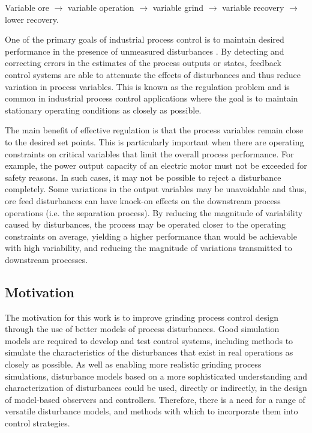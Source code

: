 Variable ore $\to$ variable operation $\to$ variable grind $\to$ variable recovery $\to$ lower recovery. 

One of the primary goals of industrial process control is to maintain desired performance in the presence of unmeasured disturbances \citep{astrom_computer_1997}. By detecting and correcting errors in the estimates of the process outputs or states, feedback control systems are able to attenuate the effects of disturbances and thus reduce variation in process variables. This is known as the regulation problem and is common in industrial process control applications where the goal is to maintain stationary operating conditions as closely as possible.

The main benefit of effective regulation is that the process variables remain close to the desired set points. This is particularly important when there are operating constraints on critical variables that limit the overall process performance. For example, the power output capacity of an electric motor must not be exceeded for safety reasons. In such cases, it may not be possible to reject a disturbance completely. Some variations in the output variables may be unavoidable and thus, ore feed disturbances can have knock-on effects on the downstream process operations (i.e. the separation process). By reducing the magnitude of variability caused by disturbances, the process may be operated closer to the operating constraints on average, yielding a higher performance than would be achievable with high variability, and reducing the magnitude of variations transmitted to downstream processes.

\subsection*{Motivation}

The motivation for this work is to improve grinding process control design through the use of better models of process disturbances. Good simulation models are required to develop and test control systems, including methods to simulate the characteristics of the disturbances that exist in real operations as closely as possible. As well as enabling more realistic grinding process simulations, disturbance models based on a more sophisticated understanding and characterization of disturbances could be used, directly or indirectly, in the design of model-based observers and controllers. Therefore, there is a need for a range of versatile disturbance models, and methods with which to incorporate them into control strategies.

